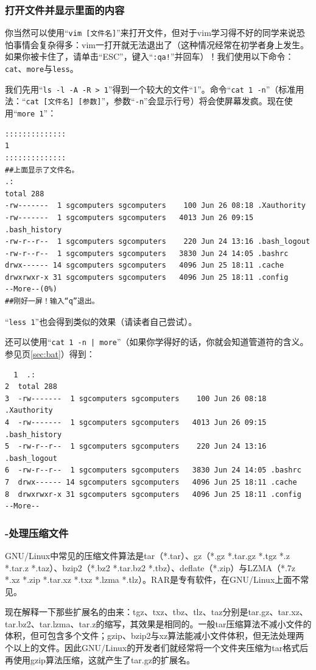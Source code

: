 \subsubsection{打开文件并显示里面的内容}
你当然可以使用“\verb|vim [文件名]|”来打开文件，但对于vim学习得不好的同学来说恐怕事情会复杂得多：vim一打开就无法退出了（这种情况经常在初学者身上发生。如果你被卡住了，请单击“ESC”，键入“\verb|:qa!|”并回车）！我们使用以下命令：\verb|cat|、\verb|more|与\verb|less|。\par
我们先用“\verb|ls -l -A -R > 1|”得到一个较大的文件“1”。命令“\verb|cat 1 -n|”（标准用法：“\verb|cat [文件名] [参数]|”，参数“\verb|-n|”会显示行号）将会使屏幕发疯。现在使用“\verb|more 1|”：
\begin{verbatim}
::::::::::::::
1
::::::::::::::
##上面显示了文件名。
.:
total 288
-rw-------  1 sgcomputers sgcomputers    100 Jun 26 08:18 .Xauthority
-rw-------  1 sgcomputers sgcomputers   4013 Jun 26 09:15 .bash_history
-rw-r--r--  1 sgcomputers sgcomputers    220 Jun 24 13:16 .bash_logout
-rw-r--r--  1 sgcomputers sgcomputers   3830 Jun 24 14:05 .bashrc
drwx------ 14 sgcomputers sgcomputers   4096 Jun 25 18:11 .cache
drwxrwxr-x 31 sgcomputers sgcomputers   4096 Jun 25 18:11 .config
--More--(0%)
##刚好一屏！输入“q”退出。
\end{verbatim} \par
“\verb|less 1|”也会得到类似的效果（请读者自己尝试）。\par
还可以使用“\verb/cat 1 -n | more/”（如果你学得好的话，你就会知道管道符的含义。参见\pageref{sec:bat}页\ref{sec:bat}）得到：
\begin{verbatim}
  1  .:
2  total 288
3  -rw-------  1 sgcomputers sgcomputers    100 Jun 26 08:18 .Xauthority
4  -rw-------  1 sgcomputers sgcomputers   4013 Jun 26 09:15 .bash_history
5  -rw-r--r--  1 sgcomputers sgcomputers    220 Jun 24 13:16 .bash_logout
6  -rw-r--r--  1 sgcomputers sgcomputers   3830 Jun 24 14:05 .bashrc
7  drwx------ 14 sgcomputers sgcomputers   4096 Jun 25 18:11 .cache
8  drwxrwxr-x 31 sgcomputers sgcomputers   4096 Jun 25 18:11 .config
--More--
\end{verbatim}
\subsubsection{-处理压缩文件}
GNU/Linux中常见的压缩文件算法是tar（*.tar）、gz（*.gz *.tar.gz *.tgz *.z *.tar.z *.taz）、bzip2（*.bz2 *.tar.bz2 *.tbz）、deflate（*.zip）与LZMA（*.7z *.xz *.zip *.tar.xz *.txz *.lzma *.tlz）。RAR是专有软件，在GNU/Linux上面不常见。\par
现在解释一下那些扩展名的由来：tgz、txz、tbz、tlz、taz分别是tar.gz、tar.xz、tar.bz2、tar.lzma、tar.z的缩写，其效果是相同的。一般tar压缩算法不减小文件的体积，但可包含多个文件；gzip、bzip2与xz算法能减小文件体积，但无法处理两个以上的文件。因此GNU/Linux的开发者们就经常将一个文件夹压缩为tar格式后再使用gzip算法压缩，这就产生了tar.gz的扩展名。\par
